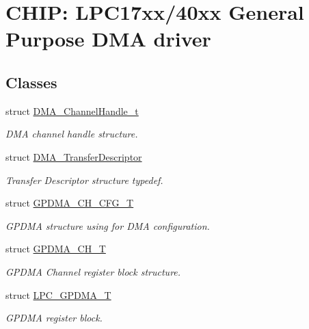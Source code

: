 \hypertarget{group__GPDMA__17XX__40XX}{}\section{C\+H\+IP\+: L\+P\+C17xx/40xx General Purpose D\+MA driver}
\label{group__GPDMA__17XX__40XX}
\subsection*{Classes}
\begin{DoxyCompactItemize}
\item 
struct \hyperlink{structDMA__ChannelHandle__t}{D\+M\+A\+\_\+\+Channel\+Handle\+\_\+t}
\begin{DoxyCompactList}\small\item\em D\+MA channel handle structure. \end{DoxyCompactList}\item 
struct \hyperlink{structDMA__TransferDescriptor}{D\+M\+A\+\_\+\+Transfer\+Descriptor}
\begin{DoxyCompactList}\small\item\em Transfer Descriptor structure typedef. \end{DoxyCompactList}\item 
struct \hyperlink{structGPDMA__CH__CFG__T}{G\+P\+D\+M\+A\+\_\+\+C\+H\+\_\+\+C\+F\+G\+\_\+T}
\begin{DoxyCompactList}\small\item\em G\+P\+D\+MA structure using for D\+MA configuration. \end{DoxyCompactList}\item 
struct \hyperlink{structGPDMA__CH__T}{G\+P\+D\+M\+A\+\_\+\+C\+H\+\_\+T}
\begin{DoxyCompactList}\small\item\em G\+P\+D\+MA Channel register block structure. \end{DoxyCompactList}\item 
struct \hyperlink{structLPC__GPDMA__T}{L\+P\+C\+\_\+\+G\+P\+D\+M\+A\+\_\+T}
\begin{DoxyCompactList}\small\item\em G\+P\+D\+MA register block. \end{DoxyCompactList}\end{DoxyCompactItemize}
